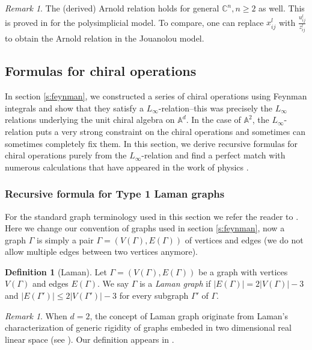 \documentclass[11pt]{amsart}
\theoremstyle{definition}
\newtheorem{defn}[thm]{Definition}
\theoremstyle{remark}
\newtheorem{rem}[thm]{Remark}
\numberwithin{equation}{section}
\begin{document}
\begin{rem}
  The (derived) Arnold relation holds for general $\mathbb{C}^n,n\geq 2$ as well. This is proved in \cite{FGY} for the polysimplicial model.
  To compare, one can replace $x^l_{ij}$ with $\frac{u^l_{ij}}{z^l_{ij}}$ to obtain the Arnold relation in the Jouanolou model.
\end{rem}

\subsection{Formulas for chiral operations}


In section \ref{s:feynman}, we constructed a series of chiral operations using Feynman integrals and show that they satisfy a
$L_{\infty}$-relation--this was precisely the $L_\infty$ relations underlying the unit chiral algebra on $\mathbb{A}
^d$.
In the case of $\mathbb{A}^2$, the $L_{\infty}$-relation puts a very strong constraint on the chiral
operations and sometimes can sometimes completely fix them. In this section, we derive recursive formulas for chiral
operations purely from the $L_{\infty}$-relation and find a perfect match with numerous calculations that have appeared
in the work of physics
\cite{budzik2023feynman}.

\subsubsection{Recursive formula for Type 1 Laman graphs}
For the standard graph terminology used in this section we refer the reader to \cite{graver1993combinatorial}. Here we change our convention of graphs used in section \ref{s:feynman}, now a graph $\Gamma$ is simply a pair $\Gamma=(V(\Gamma),E(\Gamma))$ of vertices and edges (we do not allow multiple edges between two vertices anymore).


\begin{defn}[Laman]
Let $\Gamma=\left(V(\Gamma),E(\Gamma)\right)$ be a graph with vertices $V(\Gamma)$ and edges $E(\Gamma)$.
We say $\Gamma$ is a \textit{Laman graph} if $|E(\Gamma)|=2|V(\Gamma)|-3$ and $|E(\Gamma')|\leq 2|V(\Gamma')| -3$ for every subgraph $\Gamma'$ of $\Gamma$.
\end{defn}

\begin{rem}
  When $d = 2$, the concept of Laman graph originate from Laman's
  characterization of generic rigidity of graphs embeded in two dimensional
  real linear space (see {\cite{Laman1970OnGA}}). Our definition appears in
  {\cite{budzik2023feynman}}.
\end{rem}
\end{document}
